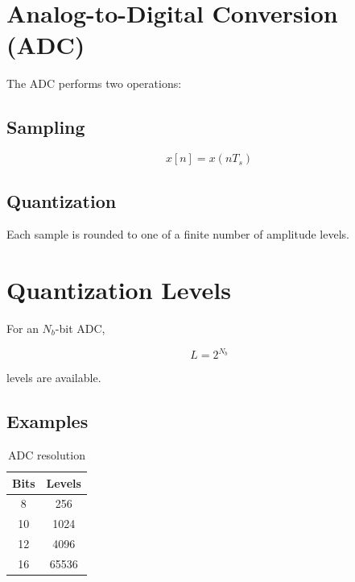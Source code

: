 
\section{Analog-to-Digital Conversion (ADC)}

The ADC performs two operations:


\subsection{Sampling}

\[
x[n]=x(nT_s)
\]


\subsection{Quantization}

Each sample is rounded to one of a finite number of amplitude levels.


\section{Quantization Levels}

For an \(N_b\)-bit ADC,

\[
\boxed{
L=2^{N_b}
}
\]

levels are available.


\subsection{Examples}

\begin{table}[H]
\centering
\caption{ADC resolution}
\begin{tabular}{|c|c|}
\hline
\textbf{Bits} & \textbf{Levels}\\
\hline
8 & 256\\
10 & 1024\\
12 & 4096\\
16 & 65536\\
\hline
\end{tabular}
\end{table}

